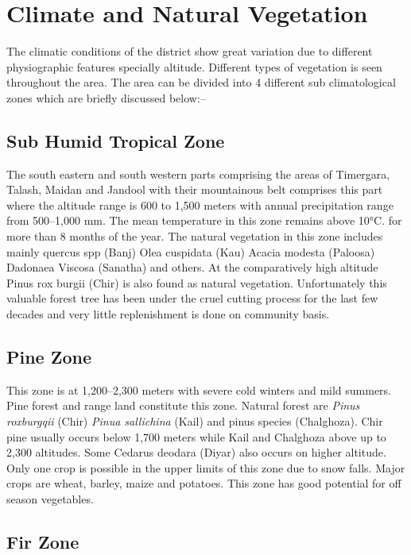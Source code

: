 \documentclass[twoside,openright]{book}
\begin{document}
\section{Climate and Natural Vegetation}

The climatic conditions of the district show great variation
due to different physiographic features specially altitude.
Different types of vegetation is seen throughout the area. The
area can be divided into 4 different sub climatological zones which
are briefly discussed below:--

\subsection{Sub Humid Tropical Zone}

The south eastern and south western parts comprising the areas of Timergara,
Talash, Maidan and Jandool with their mountainous belt comprises this part where
the altitude range is 600 to 1,500 meters with annual precipitation range from
500--1,000 mm. The mean temperature in this zone remains above 10°C. for more
than 8 months of the year. The natural vegetation in this zone includes mainly
quercus spp (Banj) Olea cuspidata (Kau) Acacia modesta (Paloosa) Dadonaea
Viscosa (Sanatha) and others. At the comparatively high altitude Pinus rox
burgii (Chir) is also found as natural vegetation. Unfortunately this valuable
forest tree has been under the cruel cutting process for the last few decades
and very little replenishment is  done on community basis.

\subsection{Pine Zone}

This zone is at 1,200--2,300 meters with severe cold winters and mild summers.
Pine forest and range land constitute this zone. Natural forest are \emph{Pinus
roxburgqii} (Chir) \emph{Pinua sallichina} (Kail) and pinus species (Chalghoza).
Chir pine usually occurs below 1,700 meters while Kail and Chalghoza above up to
2,300 altitudes. Some Cedarus deodara (Diyar) also occurs on higher altitude.
Only one crop is possible in the upper limits of this zone due to snow falls.
Major crops are wheat, barley, maize and potatoes. This zone has good potential
for off season vegetables.

\subsection{Fir Zone}
\end{document}
